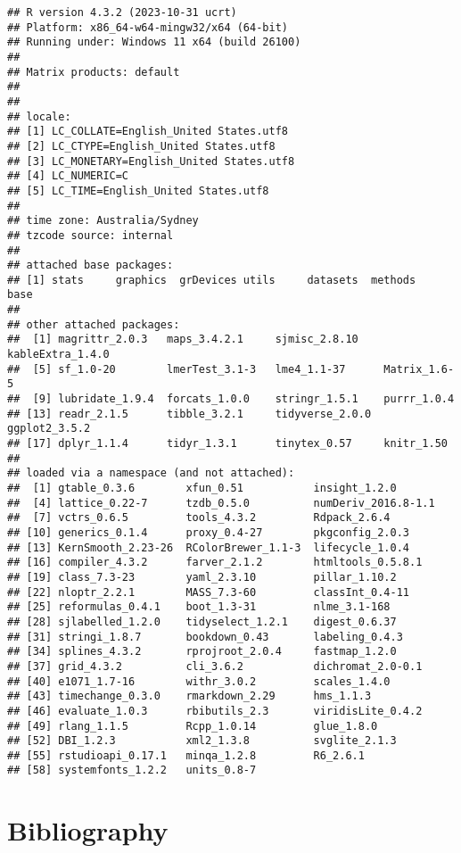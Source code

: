 \documentclass[
]{article}
\begin{document}
\begin{verbatim}
## R version 4.3.2 (2023-10-31 ucrt)
## Platform: x86_64-w64-mingw32/x64 (64-bit)
## Running under: Windows 11 x64 (build 26100)
## 
## Matrix products: default
## 
## 
## locale:
## [1] LC_COLLATE=English_United States.utf8 
## [2] LC_CTYPE=English_United States.utf8   
## [3] LC_MONETARY=English_United States.utf8
## [4] LC_NUMERIC=C                          
## [5] LC_TIME=English_United States.utf8    
## 
## time zone: Australia/Sydney
## tzcode source: internal
## 
## attached base packages:
## [1] stats     graphics  grDevices utils     datasets  methods   base     
## 
## other attached packages:
##  [1] magrittr_2.0.3   maps_3.4.2.1     sjmisc_2.8.10    kableExtra_1.4.0
##  [5] sf_1.0-20        lmerTest_3.1-3   lme4_1.1-37      Matrix_1.6-5    
##  [9] lubridate_1.9.4  forcats_1.0.0    stringr_1.5.1    purrr_1.0.4     
## [13] readr_2.1.5      tibble_3.2.1     tidyverse_2.0.0  ggplot2_3.5.2   
## [17] dplyr_1.1.4      tidyr_1.3.1      tinytex_0.57     knitr_1.50      
## 
## loaded via a namespace (and not attached):
##  [1] gtable_0.3.6        xfun_0.51           insight_1.2.0      
##  [4] lattice_0.22-7      tzdb_0.5.0          numDeriv_2016.8-1.1
##  [7] vctrs_0.6.5         tools_4.3.2         Rdpack_2.6.4       
## [10] generics_0.1.4      proxy_0.4-27        pkgconfig_2.0.3    
## [13] KernSmooth_2.23-26  RColorBrewer_1.1-3  lifecycle_1.0.4    
## [16] compiler_4.3.2      farver_2.1.2        htmltools_0.5.8.1  
## [19] class_7.3-23        yaml_2.3.10         pillar_1.10.2      
## [22] nloptr_2.2.1        MASS_7.3-60         classInt_0.4-11    
## [25] reformulas_0.4.1    boot_1.3-31         nlme_3.1-168       
## [28] sjlabelled_1.2.0    tidyselect_1.2.1    digest_0.6.37      
## [31] stringi_1.8.7       bookdown_0.43       labeling_0.4.3     
## [34] splines_4.3.2       rprojroot_2.0.4     fastmap_1.2.0      
## [37] grid_4.3.2          cli_3.6.2           dichromat_2.0-0.1  
## [40] e1071_1.7-16        withr_3.0.2         scales_1.4.0       
## [43] timechange_0.3.0    rmarkdown_2.29      hms_1.1.3          
## [46] evaluate_1.0.3      rbibutils_2.3       viridisLite_0.4.2  
## [49] rlang_1.1.5         Rcpp_1.0.14         glue_1.8.0         
## [52] DBI_1.2.3           xml2_1.3.8          svglite_2.1.3      
## [55] rstudioapi_0.17.1   minqa_1.2.8         R6_2.6.1           
## [58] systemfonts_1.2.2   units_0.8-7
\end{verbatim}

\newpage

\section*{Bibliography}\label{bibliography}
\end{document}
